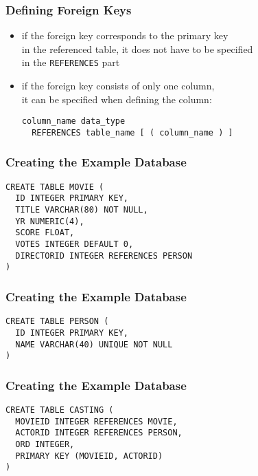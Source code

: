\documentclass[dvipsnames]{beamer}
\theoremstyle{plain}
\begin{document}
\begin{frame}[fragile]
  \frametitle{Defining Foreign Keys}

  \begin{itemize}
    \item if the foreign key corresponds to the primary key\\
      in the referenced table, it does not have to be specified\\
      in the \texttt{REFERENCES} part

    \pause
    \medskip
    \item if the foreign key consists of only one column,\\
      it can be specified when defining the column:
    \begin{lstlisting}
column_name data_type
  REFERENCES table_name [ ( column_name ) ]
    \end{lstlisting}
  \end{itemize}
\end{frame}

\begin{frame}[fragile]
  \frametitle{Creating the Example Database}

  \begin{example}
    \begin{lstlisting}
CREATE TABLE MOVIE (
  ID INTEGER PRIMARY KEY,
  TITLE VARCHAR(80) NOT NULL,
  YR NUMERIC(4),
  SCORE FLOAT,
  VOTES INTEGER DEFAULT 0,
  DIRECTORID INTEGER REFERENCES PERSON
)
    \end{lstlisting}
  \end{example}
\end{frame}

\begin{frame}[fragile]
  \frametitle{Creating the Example Database}

  \begin{example}
    \begin{lstlisting}
CREATE TABLE PERSON (
  ID INTEGER PRIMARY KEY,
  NAME VARCHAR(40) UNIQUE NOT NULL
)
    \end{lstlisting}
  \end{example}
\end{frame}

\begin{frame}[fragile]
  \frametitle{Creating the Example Database}

  \begin{example}
    \begin{lstlisting}
CREATE TABLE CASTING (
  MOVIEID INTEGER REFERENCES MOVIE,
  ACTORID INTEGER REFERENCES PERSON,
  ORD INTEGER,
  PRIMARY KEY (MOVIEID, ACTORID)
)
    \end{lstlisting}
  \end{example}
\end{frame}
\end{document}

